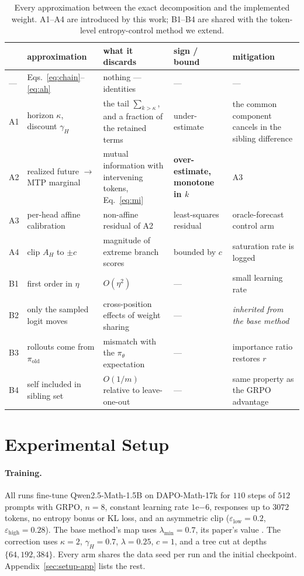\documentclass[11pt]{article}
\newcommand{\AH}{A_{H}}
\newcommand{\pit}{\pi_{\theta}}
\begin{document}
\begin{table}[t]
\centering
\footnotesize
\setlength{\tabcolsep}{4pt}
\begin{tabular}{@{}lp{2.6cm}p{4.0cm}p{2.3cm}p{4.1cm}@{}}
\toprule
& approximation & what it discards & sign / bound & mitigation \\
\midrule
--- & Eqs.~\eqref{eq:chain}--\eqref{eq:ah} & nothing --- identities & --- & --- \\
A1 & horizon $\kappa$, discount $\gamma_H$ & the tail $\sum_{k>\kappa}$, and a fraction of the retained terms & under-estimate & the common component cancels in the sibling difference \\
A2 & realized future $\to$ MTP marginal & mutual information with intervening tokens, Eq.~\eqref{eq:mi} & \textbf{over-estimate, monotone in $k$} & A3 \\
A3 & per-head affine calibration & non-affine residual of A2 & least-squares residual & oracle-forecast control arm \\
A4 & clip $\AH$ to $\pm c$ & magnitude of extreme branch scores & bounded by $c$ & saturation rate is logged \\
B1 & first order in $\eta$ & $O(\eta^2)$ & --- & small learning rate \\
B2 & only the sampled logit moves & cross-position effects of weight sharing & --- & \emph{inherited from the base method} \\
B3 & rollouts come from $\pi_{\mathrm{old}}$ & mismatch with the $\pit$ expectation & --- & importance ratio restores $r$ \\
B4 & self included in sibling set & $O(1/m)$ relative to leave-one-out & --- & same property as the GRPO advantage \\
\bottomrule
\end{tabular}
\caption{Every approximation between the exact decomposition and the implemented
weight. A1--A4 are introduced by this work; B1--B4 are shared with the token-level
entropy-control method we extend.}
\label{tab:ledger}
\end{table}

\section{Experimental Setup}
\label{sec:setup}

\paragraph{Training.} All runs fine-tune Qwen2.5-Math-1.5B \citep{yang2024aqwen} on
DAPO-Math-17k \citep{yu2025dapo} for $110$ steps of $512$ prompts with GRPO, $n = 8$,
constant learning rate $1\mathrm{e}{-6}$, responses up to $3072$ tokens, no entropy
bonus or KL loss, and an asymmetric clip ($\varepsilon_{\mathrm{low}} = 0.2$,
$\varepsilon_{\mathrm{high}} = 0.28$). The base method's map uses $\lambda_{\min} =
0.7$, its paper's value \citep[App.~F.1]{steer}. The correction uses $\kappa = 2$, $\gamma_H =
0.7$, $\lambda = 0.25$, $c = 1$, and a tree cut at depths $\{64, 192, 384\}$. Every arm
shares the data seed per run and the initial checkpoint. Appendix~\ref{sec:setup-app}
lists the rest.
\end{document}
